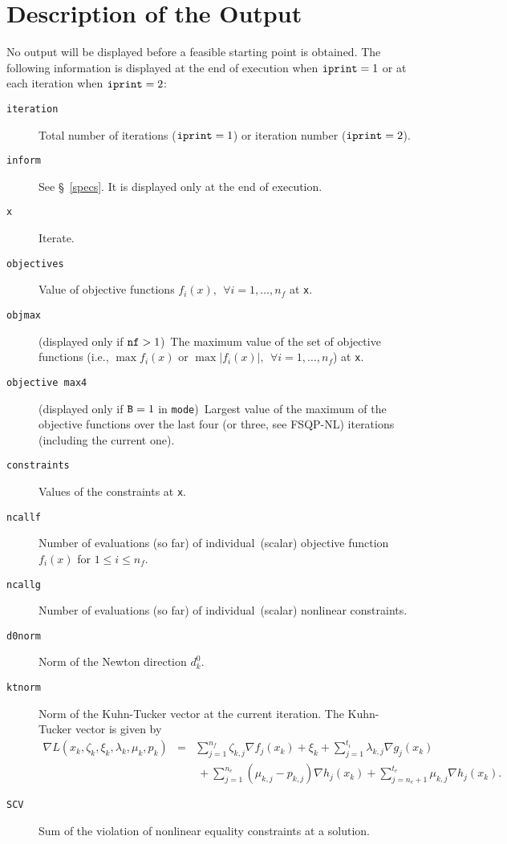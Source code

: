 \section{Description of the Output}
\label{output}
No output will be displayed before a feasible starting 
point is obtained. The following information is displayed 
at the end of execution when 
${\tt iprint} = 1$ or at each iteration when ${\tt iprint}=2$:
\begin{description}
\item[\tt iteration]  Total number of iterations (${\tt iprint}=1$) or
                   iteration number (${\tt iprint}=2$).
\item[\tt inform]  See \S~\ref{specs}. It is displayed only
                   at the end of execution.
\item[\tt x]       Iterate.
\item[\tt objectives]  Value of objective functions $f_i(x),~~\forall 
                    i=1,\ldots,n_f$ at {\tt x}. 
\item[\tt objmax]  (displayed only if $\mbox{\tt nf} > 1$)~The 
                   maximum value of the set of objective 
        functions (i.e., $\max f_i(x) \mbox{ or } \max |f_i(x)|,~~
        \forall i=1,\ldots,n_f$) at {\tt x}.
\item[\tt objective max4]  (displayed only if $\mbox{\tt B} = 1$ 
                   in {\tt mode})~Largest value of
                   the maximum of the objective functions over the 
                   last four (or three, see FSQP-NL) 
                   iterations (including the current one).
\item[\tt constraints] Values of the constraints at {\tt x}.
\item[\tt ncallf]  Number of evaluations (so far) of 
                   individual~(scalar) objective function $f_i(x)$ 
                   for $1\leq i \leq n_f.$
\item[\tt ncallg]  Number of evaluations (so far) of 
                   individual~(scalar) nonlinear constraints.
\item[\tt d0norm]  Norm of the Newton direction $d_k^0$.
\item[\tt ktnorm]  Norm of the Kuhn-Tucker vector at the current 
                   iteration. The Kuhn-Tucker vector is given by
$$\begin{array}{lll}
\nabla L(x_k,\zeta_k,\xi_k,\lambda_k,\mu_k,p_k)& = &
\sum\limits_{j=1}^{n_f} \zeta _{k,j}\nabla f_j(x_k)+
\xi_k+\sum\limits_{j=1}^{t_i}\lambda _{k,j}\nabla g_j(x_k) \\
& &~+\sum\limits_{j=1}^{n_e}(\mu_{k,j}-p_{k,j})\nabla h_j(x_k)
    +\sum\limits_{j=n_e+1}^{t_e}\mu_{k,j}\nabla h_j(x_k).\end{array}$$
\item[\tt SCV]     Sum of the violation of nonlinear equality constraints
at a solution.
\end{description}

